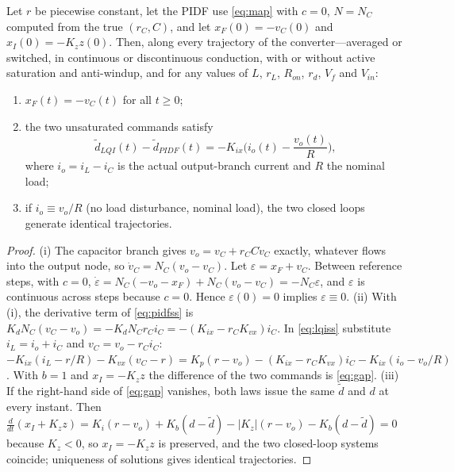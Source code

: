 \begin{proposition}\label{prop:struct}
Let $r$ be piecewise constant, let the PIDF use \eqref{eq:map} with $c=0$,
$N=N_C$ computed from the true $(r_C,C)$, and let $x_F(0)=-v_C(0)$ and
$x_I(0)=-K_zz(0)$. Then, along every trajectory of the converter---averaged or
switched, in continuous or discontinuous conduction, with or without active
saturation and anti-windup, and for any values of $L$, $r_L$, $R_{on}$, $r_d$,
$V_f$ and $V_{in}$:
\begin{enumerate}
\item[(i)] $x_F(t)=-v_C(t)$ for all $t\ge0$;
\item[(ii)] the two unsaturated commands satisfy
\begin{equation}
\tilde d_{LQI}(t)-\tilde d_{PIDF}(t)=-K_{ix}\Big(i_o(t)-\frac{v_o(t)}{R}\Big),
\label{eq:gap}
\end{equation}
where $i_o=i_L-i_C$ is the actual output-branch current and $R$ the nominal load;
\item[(iii)] if $i_o\equiv v_o/R$ (no load disturbance, nominal load), the
two closed loops generate identical trajectories.
\end{enumerate}
\end{proposition}
\begin{proof}
(i) The capacitor branch gives $v_o=v_C+r_CC\dot v_C$ exactly, whatever flows
into the output node, so $\dot v_C=N_C(v_o-v_C)$. Let $\varepsilon=x_F+v_C$.
Between reference steps, with $c=0$,
$\dot\varepsilon=N_C(-v_o-x_F)+N_C(v_o-v_C)=-N_C\varepsilon$, and $\varepsilon$
is continuous across steps because $c=0$. Hence $\varepsilon(0)=0$ implies
$\varepsilon\equiv0$.
(ii) With (i), the derivative term of \eqref{eq:pidfss} is
$K_dN_C(v_C-v_o)=-K_dN_Cr_Ci_C=-(K_{ix}-r_CK_{vx})i_C$. In \eqref{eq:lqiss}
substitute $i_L=i_o+i_C$ and $v_C=v_o-r_Ci_C$:
$-K_{ix}(i_L-r/R)-K_{vx}(v_C-r)=K_p(r-v_o)-(K_{ix}-r_CK_{vx})i_C-K_{ix}(i_o-v_o/R)$.
With $b=1$ and $x_I=-K_zz$ the difference of the two commands is
\eqref{eq:gap}.
(iii) If the right-hand side of \eqref{eq:gap} vanishes, both laws issue the same
$\tilde d$ and $d$ at every instant. Then
$\frac{d}{dt}(x_I+K_zz)=K_i(r-v_o)+K_b(d-\tilde d)-|K_z|(r-v_o)-K_b(d-\tilde d)=0$
because $K_z<0$, so $x_I=-K_zz$ is preserved, and the two closed-loop systems
coincide; uniqueness of solutions gives identical trajectories.
\end{proof}

